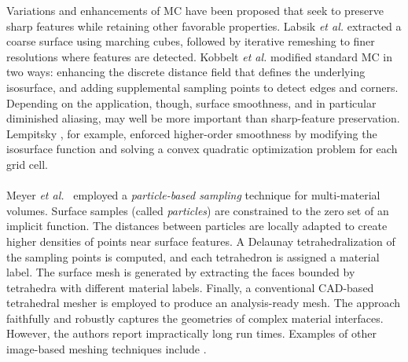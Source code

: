 %
Variations and enhancements of MC have been proposed that seek to preserve sharp features while retaining other favorable properties.  Labsik \textit{et al.} \cite{labsik_2002} extracted a coarse surface using marching cubes, followed by iterative remeshing to finer resolutions where features are detected.  Kobbelt \textit{et al.} \cite{kobbelt_2001} modified standard MC in two ways:  enhancing the discrete distance field that defines the underlying isosurface, and adding supplemental sampling points to detect edges and corners. Depending on the application, though, surface smoothness, and in particular diminished aliasing, may well be more important than sharp-feature preservation. Lempitsky \cite{lempitsky_2010}, for example, enforced higher-order smoothness by modifying the isosurface function and solving a convex quadratic optimization problem for each grid cell. \\ \\
%
Meyer \textit{et al.}~\cite{meyer_2008} employed a \textit{particle-based sampling} technique for multi-material volumes. Surface samples (called \textit{particles}) are constrained to the zero set of an implicit function. The distances between particles are locally adapted to create higher densities of points near surface features. A Delaunay tetrahedralization of the sampling points is computed, and each tetrahedron is assigned a material label. The surface mesh is generated by extracting the faces bounded by tetrahedra with different material labels. Finally, a conventional CAD-based tetrahedral mesher is employed to produce an analysis-ready mesh. The approach faithfully and robustly captures the geometries of complex material interfaces. However, the authors report impractically long run times.
Examples of other image-based meshing techniques include \cite{fang_2009, mohamed_2004, jermyn_2013, boissonnat_2009}. \\ \\
%
